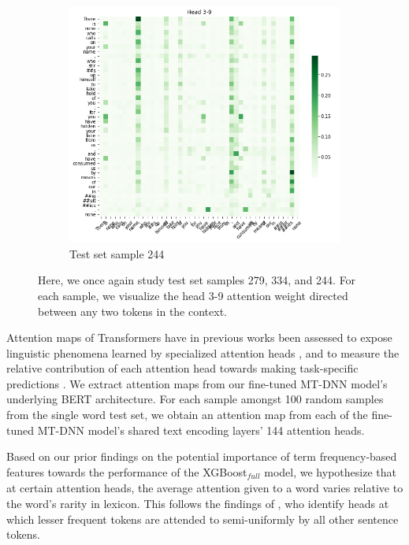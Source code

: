 \documentclass{dcthesis}
\theoremstyle{definition}
\theoremstyle{remark}
\begin{document}
\begin{figure}
  \begin{subfigure}[b]{0.75\textwidth}
    \includegraphics[width=1\linewidth]{head_3-9_3.png}
    \caption{Test set sample 244}
    \label{fig:head_3-9_3} 
  \end{subfigure}\vspace{10mm}
  \caption{\label{fig:head_3-9} Here, we once again study test set samples 279, 334, and 244. For each sample, we visualize the head 3-9 attention weight directed between any two tokens in the context.}
\end{figure}

Attention maps of Transformers have in previous works been assessed to expose linguistic phenomena learned by specialized attention heads \citep{voita2019analyzing, clark2019does}, and to measure the relative contribution of each attention head towards making task-specific predictions \citep{voita2019analyzing, michel2019sixteen}. We extract attention maps from our fine-tuned MT-DNN model's underlying BERT architecture. For each sample amongst 100 random samples from the single word test set, we obtain an attention map from each of the fine-tuned MT-DNN model's shared text encoding layers' 144 attention heads.

Based on our prior findings on the potential importance of term frequency-based features towards the performance of the XGBoost$_\textit{full}$ model, we hypothesize that at certain attention heads, the average attention given to a word varies relative to the word's rarity in lexicon. This follows the findings of \citealp{voita2019analyzing}, who identify heads at which lesser frequent tokens are attended to semi-uniformly by all other sentence tokens. 
\end{document}
